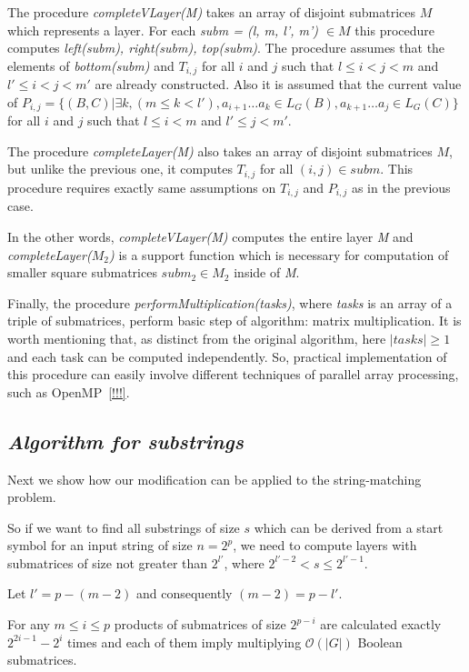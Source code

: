 The procedure \textit{completeVLayer(M)} takes an array of disjoint submatrices $M$ which represents a layer.
For each \textit{subm = (l, m, l', m') $\in M$} this procedure computes \textit{left(subm), right(subm), top(subm)}.
The procedure assumes that the elements of \textit{bottom(subm)} and $T_{i, j}$ for all $i$ and $j$ such that $l \leq i < j < m$ and $  l' \leq i < j < m'$ are already constructed.
Also it is assumed that the current value of
$P_{i, j} =  \{ (B, C) | \exists k, (m \le k < l'), a_{i + 1} \dots a_{k} \in L_G(B), a_{k + 1} \dots a_{j} \in L_G(C)\} $ for all $i$ and $j$ such that $l \leq i < m$ and $l' \leq j < m'$.

The procedure \textit{completeLayer(M)} also takes an array of disjoint submatrices $M$, but unlike the previous one, it computes $T_{i, j}$ for all $(i, j) \in subm$.
This procedure requires exactly same assumptions on $T_{i, j}$  and $P_{i, j}$  as in the previous case.

In the other words, \textit{completeVLayer(M)} computes the entire layer \textit{M} \linebreak and \textit{completeLayer($M_{2}$)} is a support function which is necessary for computation of smaller square submatrices $subm_{2} \in M_{2}$ inside of \textit{M}.

Finally, the procedure \textit{performMultiplication(tasks)}, where \textit{tasks} is an array of a triple of submatrices, perform basic step of algorithm: matrix multiplication. It is worth mentioning that, as distinct from the original algorithm, here $|tasks| \ge 1$ and each task can be computed independently.
So, practical implementation of this procedure can easily involve different techniques of parallel array processing, such as OpenMP~\ref{!!!}.

\subsection{\bf \it Algorithm for substrings}

Next we show how our modification can be applied to the string-matching problem.

So if we want to find all substrings of size $s$ which can be derived from a start symbol for an input string of size $n = 2^p$, we need to compute layers with submatrices of size not greater than $2^{l'}$, where $2^{l' - 2} < s \le 2^{l' - 1}$.

Let $l' = p - (m - 2)$ and consequently $(m - 2) = p - l'$.

For any  $m \le i \le p$ products of submatrices of size $2^{p - i}$ are calculated exactly $2^{2i - 1} - 2^{i}$ times and each of them imply multiplying $\mathcal{O}(|G|)$ Boolean submatrices.

